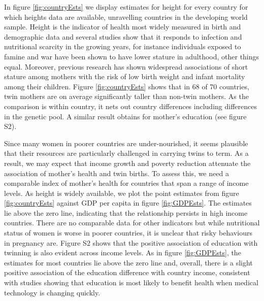 \documentclass[11pt]{article}
\begin{document}
In figure \ref{fig:countryEsts} we display estimates for height for every country for which heights data are available, unravelling countries in the developing world sample. Height is the indicator of health most widely measured in birth and demographic data and several studies show that it responds to infection and nutritional scarcity in the growing years, for instance individuals exposed to famine and war have been shown to have lower stature in adulthood, other things equal\cite{Silventoinen2003,Bozzolietal2009,Wangetal2010,Akreshetal2012}. Moreover, previous research has shown widespread associations of short stature among mothers with the risk of low birth weight and infant mortality among their children\cite{BhalotraRawlings2013}.  Figure \ref{fig:countryEsts} shows that in 68 of 70 countries, twin mothers are on average significantly taller than non-twin mothers. As the comparison is within country, it nets out country differences including differences in the genetic pool. A similar result obtains for mother's education\cite{Kenkel1991,CutlerLlerasMuney2010} (see figure S2).

Since many women in poorer countries are under-nourished, it seems plausible that their resources are particularly challenged in carrying twins to term. As a result, we may expect that income growth and poverty reduction attenuate the association of mother's health and twin births. To assess this, we need a comparable index of mother's health for countries that span a range of income levels. As height is widely available, we plot the point estimates from figure \ref{fig:countryEsts} against GDP per capita in figure \ref{fig:GDPEsts}. The estimates lie above the zero line, indicating that the relationship persists in high income countries. There are no comparable data for other indicators but while nutritional status of women is worse in poorer countries, it is unclear that risky behaviours in pregnancy are.  Figure S2 shows that the positive association of education with twinning is also evident across income levels. As in figure \ref{fig:GDPEsts}, the estimates for most countries lie above the zero line and, overall, there is a slight positive association of the education difference with country income, consistent with studies showing that education is most likely to benefit health when medical technology is changing quickly\cite{LlerasMuneyGlied2008}.
\end{document}
